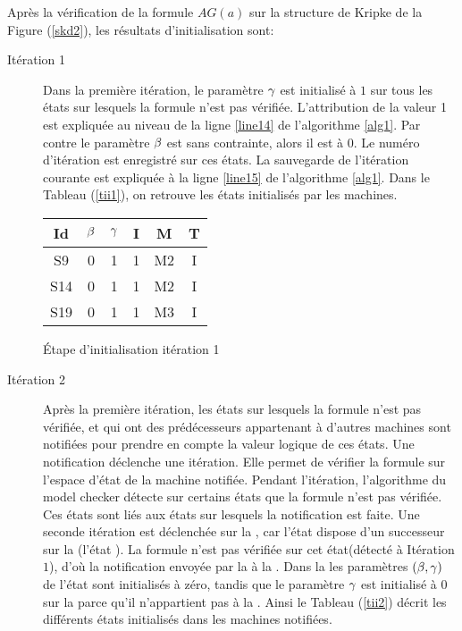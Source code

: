 \begin{Exemple}\label{ea1}
	Après la vérification de la formule \textit{$AG(a)$} sur la structure de Kripke de la Figure (\ref{skd2}), les résultats d'initialisation sont:
\begin{description}
	\item[Itération 1]				
Dans la première itération, le paramètre $\gamma{}$ est initialisé à $1$ sur tous les états sur lesquels la formule n'est pas vérifiée. L'attribution de la valeur 1 est expliquée au niveau de la ligne \ref{line14} de l'algorithme \ref{alg1}. Par contre le paramètre $\beta{}$ est sans contrainte, alors il est à $0$. Le numéro  d'itération est enregistré sur ces états. La sauvegarde de l'itération courante est expliquée à la ligne \ref{line15} de l'algorithme \ref{alg1}.
Dans le Tableau (\ref{tii1}), on retrouve les états initialisés par les machines.   
\begin{tableth}
	\centering
	\begin{tabular}{|*{6}{c|}}
		\hline
		Id	& $\beta{}$	&$\gamma{}$&	I&	M&	T\\
		\hline
		S9	&0	&1	&1	&M2	&I\\
		\hline
		S14	&0	&1	&1	&M2	&I\\
		\hline
		S19	&0	&1	&1	&M3	&I\\
		\hline
	\end{tabular}
	\caption{Étape d'initialisation itération 1}\label{tii1}
\end{tableth}	

	\item[Itération 2]				
Après la première itération, les états sur lesquels la formule n'est pas vérifiée, et qui ont des prédécesseurs appartenant à d'autres machines sont notifiées pour prendre en compte la valeur logique de ces états. Une notification déclenche une itération. Elle permet de vérifier la formule sur l'espace d'état de la machine notifiée. Pendant l'itération, l'algorithme du model checker détecte sur certains états que la formule n'est pas vérifiée. Ces états sont liés aux états sur lesquels la notification est faite.
Une seconde itération est déclenchée sur la \mone{}, car l'état  dispose d'un successeur sur la \mtwo{} (l'état ). La formule n'est pas vérifiée sur cet état(détecté à Itération $1$), d'où la notification envoyée par la \mtwo{} à la \mone{}. Dans la \mone{} les paramètres $(\beta{}, \gamma{})$ de l'état  sont initialisés à zéro, tandis que le paramètre $\gamma{}$ est initialisé à $0$ sur la \mtwo{} parce qu'il n'appartient pas à la \mtwo{}. Ainsi le Tableau (\ref{tii2}) décrit les différents états initialisés dans les machines notifiées.
      

\end{description}
\end{Exemple}
